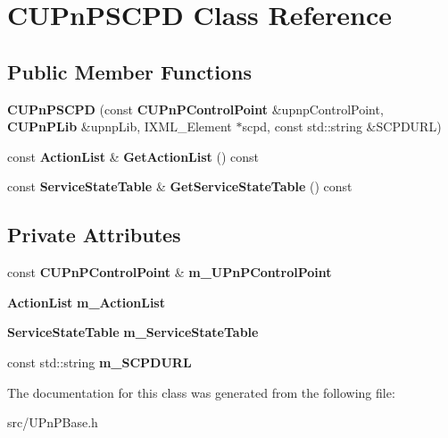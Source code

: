 \section{CUPnPSCPD Class Reference}
\label{classCUPnPSCPD}
\subsection*{Public Member Functions}
\begin{DoxyCompactItemize}
\item 
{\bfseries CUPnPSCPD} (const {\bf CUPnPControlPoint} \&upnpControlPoint, {\bf CUPnPLib} \&upnpLib, IXML\_\-Element $\ast$scpd, const std::string \&SCPDURL)\label{classCUPnPSCPD_af8157eef10334c5403deb30a241ff1fe}

\item 
const {\bf ActionList} \& {\bfseries GetActionList} () const \label{classCUPnPSCPD_adfa7a08d675ca4aa19af622f4968d4d3}

\item 
const {\bf ServiceStateTable} \& {\bfseries GetServiceStateTable} () const \label{classCUPnPSCPD_ad85b2bb983a826216ddb94a76a164a02}

\end{DoxyCompactItemize}
\subsection*{Private Attributes}
\begin{DoxyCompactItemize}
\item 
const {\bf CUPnPControlPoint} \& {\bfseries m\_\-UPnPControlPoint}\label{classCUPnPSCPD_ac6103fb1e61ae34dc816d9b93ea976b7}

\item 
{\bf ActionList} {\bfseries m\_\-ActionList}\label{classCUPnPSCPD_a22492f20f6255642896e607c4edb0f08}

\item 
{\bf ServiceStateTable} {\bfseries m\_\-ServiceStateTable}\label{classCUPnPSCPD_a454fcfbba0c7452cfa7a73a8dad5d2b3}

\item 
const std::string {\bfseries m\_\-SCPDURL}\label{classCUPnPSCPD_a2ef88c87f17cdad0aaa50bb4ea7479f6}

\end{DoxyCompactItemize}


The documentation for this class was generated from the following file:\begin{DoxyCompactItemize}
\item 
src/UPnPBase.h\end{DoxyCompactItemize}
